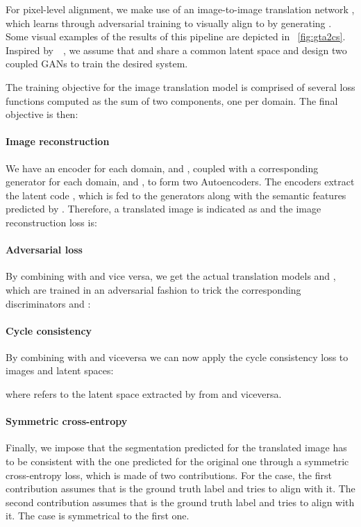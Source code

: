 \documentclass{bmvc2k}
\begin{document}
For pixel-level alignment, we make use of an image-to-image translation network , which learns through adversarial training to visually align  to  by generating . Some visual examples of the results of this pipeline are depicted in \figurename~\ref{fig:gta2cs}. Inspired by~\cite{unit}~\cite{munit}, we assume that  and  share a common latent space  and design two coupled GANs to train the desired system.

The training objective for the image translation model is comprised of several loss functions computed as the sum of two components, one per domain. The final objective is then:



\paragraph{Image reconstruction}
We have an encoder for each domain,  and , coupled with a corresponding generator for each domain,  and , to form two Autoencoders. The encoders extract the latent code , which is fed to the generators along with the semantic features predicted by . Therefore, a translated image is indicated as  and the image reconstruction loss is:



\paragraph{Adversarial loss}
By combining  with  and vice versa, we get the actual translation models  and , which are trained in an adversarial fashion to trick the corresponding discriminators  and :



\paragraph{Cycle consistency}
By combining  with  and viceversa we can now apply the cycle consistency loss to images and latent spaces:



where  refers to the latent space extracted by  from  and viceversa.

\paragraph{Symmetric cross-entropy}
Finally, we impose that the segmentation predicted for the translated image has to be consistent with the one predicted for the original one through a symmetric cross-entropy loss, which is made of two contributions. For the  case, the first contribution assumes that  is the ground truth label and tries to align  with it. The second contribution assumes that  is the ground truth label and tries to align  with it. The  case is symmetrical to the first one.
\end{document}
